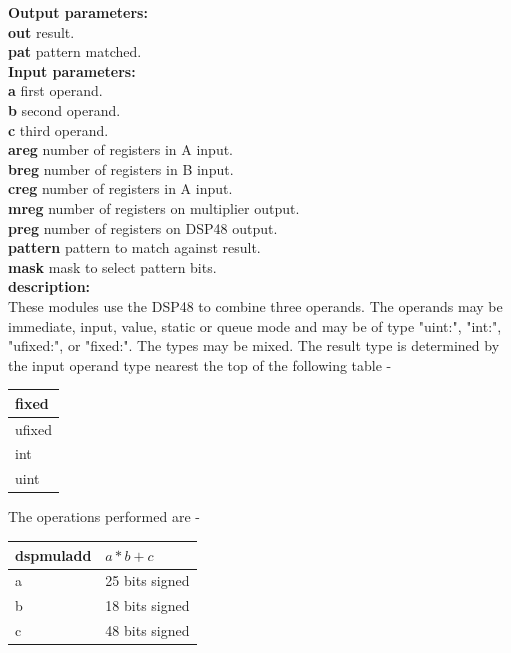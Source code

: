             {\bf Output parameters:} \\
            {\bf out} result.\\
            {\bf pat} pattern matched.\\


            {\bf Input parameters:} \\
            {\bf a} first operand.\\
            {\bf b} second operand.\\
            {\bf c} third operand.\\
            {\bf areg} number of registers in A input.\\
            {\bf breg} number of registers in B input.\\
            {\bf creg} number of registers in A input.\\
            {\bf mreg} number of registers on multiplier output.\\
            {\bf preg} number of registers on DSP48 output.\\
            {\bf pattern} pattern to match against result.\\
            {\bf mask} mask to select pattern bits.\\

            {\bf description:} \\
            These modules use the DSP48 to combine three operands. The
            operands may be immediate, input, value, static or queue mode and may
            be of type "uint:", "int:", "ufixed:", or "fixed:". The types may be
            mixed. The result type is determined by the input operand type
            nearest the top of the following table -

            \begin{tabular}{| l |}
            \hline
            fixed   \\ \hline
            ufixed  \\ \hline
            int     \\ \hline
            uint    \\ \hline
            \end{tabular}

            The operations performed are -

            \begin{tabular}{| l l |}
            \hline
            dspmuladd & $ a * b + c$ \\
            \hline
            a & 25 bits signed \\
            b & 18 bits signed \\
            c & 48 bits signed \\
            \hline
            \end{tabular}

